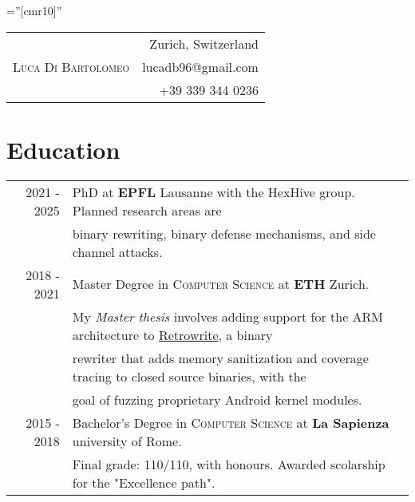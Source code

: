 \documentclass[a4paper,10pt]{article} %
\newcommand{\rw}{\href{https://hexhive.epfl.ch/publications/files/20Oakland.pdf}{Retrowrite}}
\begin{document}
\pagestyle{empty} %

\font\fb=''[cmr10]'' %

\bigskip
\bigskip


 
\begin{table}[ht]
\begin{center}
\begin{tabular}{cr}
	\multirow{3}{*}{\Huge \textsc{\hspace{2em} Luca Di Bartolomeo  \hspace{2em}}} & Zurich, Switzerland \\
& lucadb96@gmail.com \\
& +39 339 344 0236 \\
\end{tabular}
\end{center}
\end{table}



\section{Education}
\begin{tabular}{rl}
	\textsc{2021 - 2025} & PhD at \textbf{EPFL} Lausanne with the HexHive group. Planned research areas are  \\
	& binary rewriting, binary defense mechanisms, and side channel attacks. \\
\textsc{2018 - 2021} & Master Degree in \textsc{Computer Science} at \textbf{ETH} Zurich.\\
	& My \emph{Master thesis} involves adding support for the ARM architecture to \rw, a binary \\ 
	& rewriter  that adds memory sanitization and coverage tracing to closed source binaries, with the \\ 
	& goal of fuzzing proprietary Android kernel modules.\\

\textsc{2015 - 2018} & Bachelor's Degree in \textsc{Computer Science} at \textbf{La Sapienza} university of Rome.\\
&Final grade: 110/110, with honours. Awarded scolarship for the "Excellence path".\\
\end{tabular}
\end{document}
